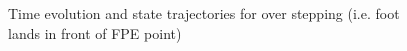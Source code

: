 \begin{figure}[!h]
	\begin{center}
	\end{center}
  	\caption{Time evolution and state trajectories for over stepping (i.e. foot lands in front of FPE point)}
	\label{sim:over}
\end{figure}

